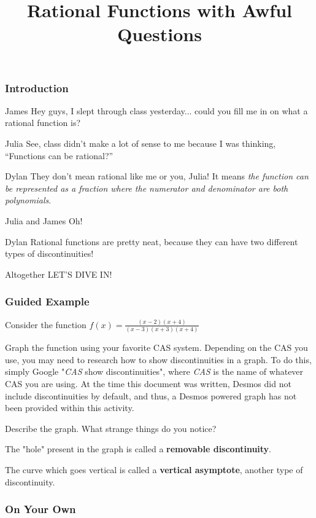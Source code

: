 \documentclass{ximera}
\title{Rational Functions with Awful Questions}
\begin{document}
\subsubsection{Introduction}
\begin{dialogue}
\item[James] Hey guys, I slept through class yesterday... could you fill me in on what a rational function is?
\item[Julia] See, class didn't make a lot of sense to me because I was thinking, ``Functions can be rational?''
\item[Dylan] They don't mean rational like me or you, Julia! It means \textit{the function can be represented as a fraction where the numerator and denominator are both polynomials}.
\item[Julia and James] Oh!
\item[Dylan] Rational functions are pretty neat, because they can have two different types of discontinuities!
\item[Altogether] LET'S DIVE IN!
\end{dialogue}
\subsubsection{Guided Example}
Consider the function $f(x)=\frac{(x-2)(x+4)}{(x-3)(x+3)(x+4)}$

Graph the function using your favorite CAS system. Depending on the CAS you use, you may need to research how to show discontinuities in a graph. To do this, simply Google "\textit{CAS} show discontinuities", where \textit{CAS} is the name of whatever CAS you are using. At the time this document was written, Desmos did not include discontinuities by default, and thus, a Desmos powered graph has not been provided within this activity.
\begin{question}
Describe the graph. What strange things do you notice?
\begin{freeResponse}
\end{freeResponse}
\end{question}
The "hole" present in the graph is called a \textbf{removable discontinuity}.

The curve which goes vertical is called a \textbf{vertical asymptote}, another type of discontinuity.

\subsubsection{On Your Own}
\end{document}
